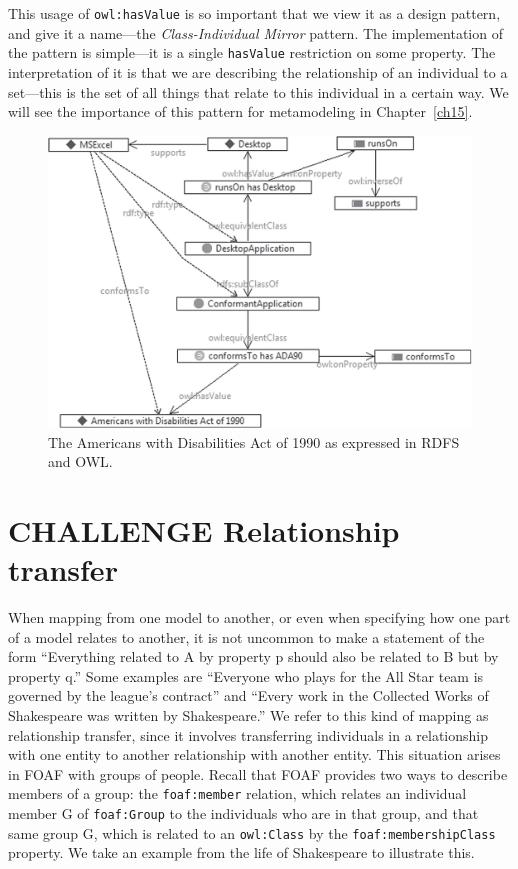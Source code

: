 This usage of \texttt{owl:hasValue} is so important that we view it as a design
pattern, and give it a name---the \emph{Class-Individual Mirror} pattern. The
implementation of the pattern is simple---it is a single \texttt{hasValue}
restriction on some property. The interpretation of it is that we are
describing the relationship of an individual to a set---this is the set
of all things that relate to this individual in a certain way. We will
see the importance of this pattern for metamodeling in Chapter~\ref{ch15}.

\begin{figure}
\centering
\includegraphics[width=5in]{media/ch12/f12-10.eps}
\caption{The Americans with Disabilities Act of 1990 as expressed in RDFS and OWL.}
\label{fig:ch12.10}
\end{figure}



\section{CHALLENGE Relationship transfer}

When mapping from one model to another, or even when specifying how one
part of a model relates to another, it is not uncommon to make a
statement of the form ``Everything related to A by property p should
also be related to B but by property q.'' Some examples are ``Everyone
who plays for the All Star team is governed by the league's contract''
and ``Every work in the Collected Works of Shakespeare was written by
Shakespeare.'' We refer to this kind of mapping as relationship
transfer, since it involves transferring individuals in a relationship
with one entity to another relationship with another entity. This
situation arises in FOAF with groups of people. Recall that FOAF
provides two ways to describe members of a group: the \texttt{foaf:member}
relation, which relates an individual member G of \texttt{foaf:Group} to the
individuals who are in that group, and that same group G, which is
related to an \texttt{owl:Class} by the \texttt{foaf:membershipClass} property. We take an
example from the life of Shakespeare to illustrate this.

